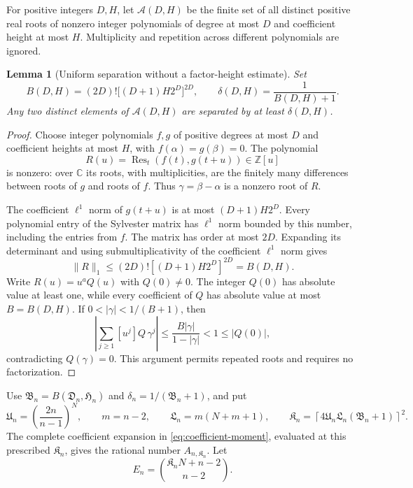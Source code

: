 \documentclass[11pt]{article}
\newtheorem{lemma}[theorem]{Lemma}
\theoremstyle{remark}
\numberwithin{equation}{section}
\begin{document}
For positive integers $D,H$, let $\mathcal A(D,H)$ be the finite set
of all distinct positive real roots of nonzero integer polynomials of
degree at most $D$ and coefficient height at most $H$.
Multiplicity and repetition across different polynomials are ignored.

\begin{lemma}[Uniform separation without a factor-height estimate]
\label{lem:universal-resultant-separation}
Set
\[
 B(D,H)=(2D)!\bigl[(D+1)H2^D\bigr]^{2D},\qquad
 \delta(D,H)=\frac1{B(D,H)+1}.
\]
Any two distinct elements of $\mathcal A(D,H)$ are separated by at
least $\delta(D,H)$.
\end{lemma}
\begin{proof}
Choose integer polynomials $f,g$ of positive degrees at most $D$ and
coefficient heights at most $H$, with $f(\alpha)=g(\beta)=0$.
The polynomial
\[
 R(u)=\operatorname{Res}_t(f(t),g(t+u))\in\mathbb Z[u]
\]
is nonzero: over $\mathbb C$ its roots, with multiplicities, are the
finitely many differences between roots of $g$ and roots of $f$.
Thus $\gamma=\beta-\alpha$ is a nonzero root of $R$.

The coefficient $\ell^1$ norm of $g(t+u)$ is at most
$(D+1)H2^D$. Every polynomial entry of the Sylvester matrix has
$\ell^1$ norm bounded by this number, including the entries from $f$.
The matrix has order at most $2D$. Expanding its determinant and using
submultiplicativity of the coefficient $\ell^1$ norm gives
\[
 \|R\|_1\le(2D)![(D+1)H2^D]^{2D}=B(D,H).
\]
Write $R(u)=u^aQ(u)$ with $Q(0)\ne0$. The integer $Q(0)$ has
absolute value at least one, while every coefficient of $Q$ has
absolute value at most $B=B(D,H)$. If $0<|\gamma|<1/(B+1)$, then
\[
 \left|\sum_{j\ge1}[u^j]Q\,\gamma^j\right|
 \le\frac{B|\gamma|}{1-|\gamma|}<1\le|Q(0)|,
\]
contradicting $Q(\gamma)=0$.
This argument permits repeated roots and requires no factorization.
\end{proof}

Use $\mathfrak{B}_n=B(\mathfrak{D}_n,\mathfrak{H}_n)$ and $\delta_n=1/(\mathfrak{B}_n+1)$, and put
\begin{equation}\label{eq:explicit-fixed-moment-order}
 \mathfrak{U}_n=\left(\frac{2n}{n-1}\right)^N,\qquad
 m=n-2,\qquad \mathfrak{L}_n=m(N+m+1),\qquad
 \mathfrak{K}_n=\left\lceil4\mathfrak{U}_n\mathfrak{L}_n(\mathfrak{B}_n+1)\right\rceil^2.
\end{equation}
The complete coefficient expansion in
\eqref{eq:coefficient-moment}, evaluated at this prescribed $\mathfrak{K}_n$,
gives the rational number $A_{n,\mathfrak{K}_n}$. Let
\[
 E_n=\binom{\mathfrak{K}_nN+n-2}{n-2}.
\]
\end{document}
